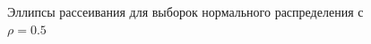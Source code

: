 \documentclass[12pt]{article}
\begin{document}
\begin{flushleft}
\begin{figure}[h]
\begin{minipage}[h]{0.325\linewidth}
            \end{minipage}
            \begin{minipage}[h]{0.325\linewidth}
            \end{minipage}
            \caption{Эллипсы рассеивания для выборок нормального распределения с $\rho = 0.5$}
            \label{rho_05}
            \end{figure}


\end{flushleft}
\end{document}
